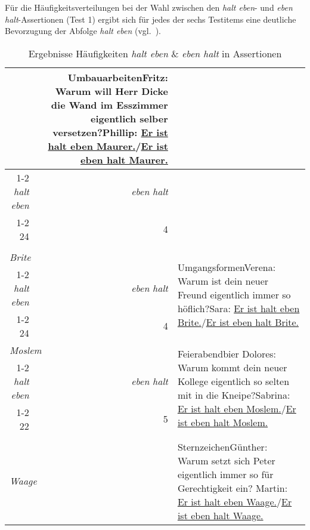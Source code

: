 Für die Häufigkeitsverteilungen bei der Wahl zwischen den \textit{halt eben}- und \textit{eben halt}-Assertionen (Test 1) ergibt sich für jedes der sechs Testitems eine deutliche Bevorzugung der Abfolge \textit{halt eben} (vgl.\ ).

\begin{table}  \renewcommand{\arraystretch}{1.15}
\caption{\label{tab:635}Ergebnisse Häufigkeiten \emph{halt eben} \& \emph{eben halt} in Assertionen}
\begin{tabularx}{\textwidth}{rrX}
\lsptoprule 
\multicolumn{2}{l}{{\textit{Maurer}}}& \multirow{4}{\hsize}{{Umbauarbeiten}\newline Fritz: Warum will Herr Dicke die Wand im Esszimmer eigentlich selber versetzen?\newline Phillip:  \ul{Er ist halt eben Maurer.}/\ul{Er ist eben halt Maurer.}}\\
\cmidrule(lr){1-2}
\emph{halt eben}& \emph{eben halt} & {}\\
\cmidrule(lr){1-2}
24 & 4 & {}\\
 &  & {}\\
\midrule
\multicolumn{2}{l}{{\textit{Brite}}}& \multirow{3}{\hsize}{{Umgangsformen}\newline Verena: Warum ist dein neuer Freund eigentlich immer so höflich?\newline Sara: \ul{Er ist halt eben Brite.}/\ul{Er ist eben halt Brite.}}\\
\cmidrule(lr){1-2}
\emph{halt eben}& \emph{eben halt} & {}\\
\cmidrule(lr){1-2}
24 & 4 & {}\\
\midrule
\multicolumn{2}{l}{{\textit{Moslem}}}& \multirow{3}{\hsize}{{Feierabendbier
}\newline Dolores: Warum kommt dein neuer Kollege eigentlich so selten mit in die Kneipe?\newline Sabrina: \ul{Er ist halt eben Moslem.}/\ul{Er ist eben halt Moslem.}}\\
\cmidrule(lr){1-2}
\emph{halt eben}& \emph{eben halt} & {}\\
\cmidrule(lr){1-2}
22 & 5 & {}\\
 &  & {}\\
\midrule
\multicolumn{2}{l}{{\textit{Waage}}}& \multirow{3}{\hsize}{{Sternzeichen}\newline Günther: Warum setzt sich Peter eigentlich immer so für Gerechtigkeit ein? \newline
Martin: \ul{Er ist halt eben Waage.}/\ul{Er ist eben halt Waage.}}\\

\end{tabularx}
\end{table}
